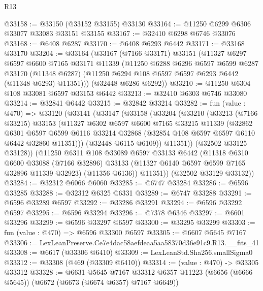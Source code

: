 \begin{lexlean}{R13}
\begin{coremodule}
@33158 := @33150 (@33152 @33155) @33130
@33164 := @11250 @6299 @6306 @33077 @33083 @33151 @33155
@33167 := @32410 @6298 @6746 @33076
@33168 := @6408 @6287
@33170 := @6408 @6293 @6442
@33171 := @33168 @33170
@33204 := @33164
    (@33167
      (@7166 @33171)
      @33151
      (@11327
        @6297
        @6597
        @6600
        @7165
        @33171
        @11339
        (@11250
          @6288
          @6296
          @6597
          @6599
          @6287
          @33170
          (@11348 @6287)
          (@11250 @6294 @108 @6597 @6597 @6293 @6442 (@11348 @6293) @11351)))
      (@32448 @6286 @6292))
@33210 := @11250 @6304 @108 @33081 @6597 @33153 @6442
@33213 := @32410 @6303 @6746 @33080
@33214 := @32841 @6442
@33215 := @32842 @33214
@33282 := fun (value : @470) =>
  @33120
    (@33141
      (@33147
        (@33158
          (@33204
            (@33210
              (@33213
                (@7166 @33215)
                @33153
                (@11327
                  @6302
                  @6597
                  @6600
                  @7165
                  @33215
                  @11339
                  (@32862
                    @6301
                    @6597
                    @6599
                    @6116
                    @33214
                    @32868
                    (@32854 @108 @6597 @6597 @6110 @6442 @32860 @11351)))
                (@32448 @6115 @6109))
              @11351))
          (@32502 @33125 @33128))
        (@11250
          @6311
          @108
          @33089
          @6597
          @33133
          @6442
          (@11318
            @6310
            @6600
            @33088
            (@7166 @32896)
            @33133
            (@11327 @6140 @6597 @6599 @7165 @32896 @11339 @32923)
            (@11356 @6136))
          @11351))
      (@32502 @33129 @33132))
@33284 := @32312 @6066 @6060
@33285 := @6747 @33284
@33286 := @6596 @33285
@33288 := @32312 @6325 @6331
@33289 := @6747 @33288
@33291 := @6596 @33289 @6597
@33292 := @33286 @33291
@33294 := @6596 @33292 @6597
@33295 := @6596 @33294
@33296 := @7378 @6346
@33297 := @6601 @33296
@33299 := @6596 @33297 @6597
@33300 := @33295 @33299
@33303 := fun (value : @470) => @6596 @33300 @6597
@33305 := @6607 @5645 @7167
@33306 := LexLeanPreserve.Ce7e4dac58aefdeaa5aa58370d36e91c9.R13.__fits_41
@33308 := @6617 (@33306 @6410)
@33309 := LexLeanStd.Sha256.smallSigma0
@33312 := @33308 (@469 (@33309 @6410))
@33314 := (value : @470) -> @33305 @33312
@33328 := @6631
    @5645
    @7167
    @33312
    @6357
    @11223
    (@6656 (@6666 @5645))
    (@6672 (@6673 (@6674 @6357) @7167 @6649))

\end{coremodule}
\end{lexlean}

